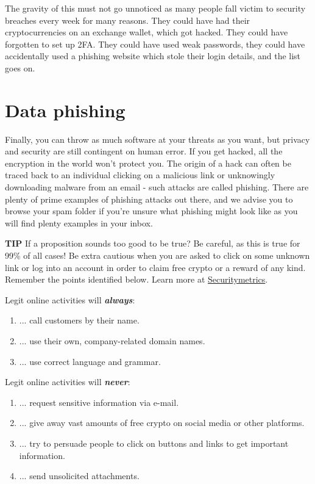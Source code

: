 The gravity of this must not go unnoticed as many people fall victim to security breaches every week for many reasons. They could have had their cryptocurrencies on an exchange wallet, which got hacked. They could have forgotten to set up 2FA. They could have used weak passwords, they could have accidentally used a phishing website which stole their login details, and the list goes on. 

\section{Data phishing}
Finally, you can throw as much software at your threats as you want, but privacy and security are still contingent on human error. If you get hacked, all the encryption in the world won't protect you. The origin of a hack can often be traced back to an individual clicking on a malicious link or unknowingly downloading malware from an email - such attacks are called phishing. There are plenty of prime examples of phishing attacks out there, and we advise you to browse your spam folder if you're unsure what phishing might look like as you will find plenty examples in your inbox.\medskip

    \begin{tipbox}{\textbf{TIP}}
        If a proposition sounds too good to be true? Be careful, as this is true for 99\% of all cases! Be extra cautious when you are asked to click on some unknown link or log into an account in order to claim free crypto or a reward of any kind. Remember the points identified below.
        \tcblower
        Learn more at \href{https://www.securitymetrics.com/blog/7-ways-recognize-phishing-email}{Securitymetrics}.
    \end{tipbox}
    \bigskip

Legit online activities will \emph{\textbf{always}}:

\begin{enumerate}[label=(\alph*)]
  \setlength\itemsep{0em}
    \item ... call customers by their name.
    \item ... use their own, company-related domain names.
    \item ... use correct language and grammar.
\end{enumerate}

Legit online activities will \emph{\textbf{never}}:

\begin{enumerate}[label=(\alph*)]
  \setlength\itemsep{0em}
    \item ... request sensitive information via e-mail.
    \item ... give away vast amounts of free crypto on social media or other platforms.
    \item ... try to persuade people to click on buttons and links to get important information.
    \item ... send unsolicited attachments.
\end{enumerate}


